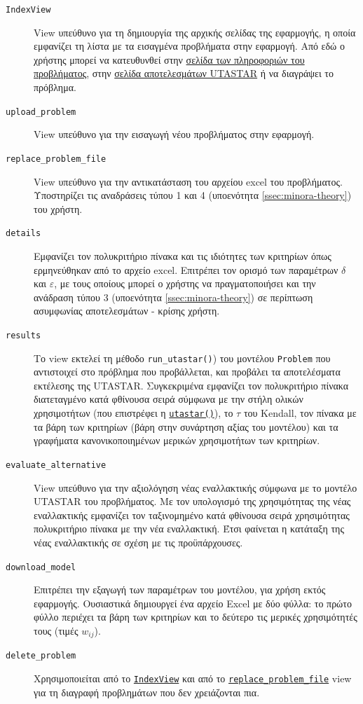 \documentclass[11pt,a4paper,titlepage]{article}
\numberwithin{equation}{section}
\begin{document}
\begin{description}
\item[\hypertarget{IndexView}{\texttt{IndexView}}] View υπεύθυνο για τη δημιουργία της αρχικής σελίδας της εφαρμογής, η 
οποία εμφανίζει τη λίστα με τα εισαγμένα προβλήματα στην εφαρμογή. Από εδώ ο χρήστης μπορεί να
κατευθυνθεί στην \hyperlink{details}{σελίδα των πληροφοριών του προβλήματος}, στην \hyperlink{results}{σελίδα αποτελεσμάτων UTASTAR} ή να διαγράψει το πρόβλημα.
\item[\hypertarget{uploadproblem}{\texttt{upload\_problem}}] View υπεύθυνο για την εισαγωγή νέου προβλήματος στην εφαρμογή.
\item[\hypertarget{replaceproblemfile}{\texttt{replace\_problem\_file}}] View υπεύθυνο για την αντικατάσταση του αρχείου excel του προβλήματος. Υποστηρίζει τις αναδράσεις τύπου 1 και 4 (υποενότητα \ref{ssec:minora-theory}) του χρήστη.
\item[\hypertarget{details}{\texttt{details}}] Εμφανίζει τον πολυκριτήριο πίνακα και τις ιδιότητες των κριτηρίων όπως ερμηνεύθηκαν από το αρχείο excel. Επιτρέπει τον ορισμό των παραμέτρων $ \delta $ και $ \varepsilon $, με τους οποίους μπορεί ο χρήστης να πραγματοποιήσει και την ανάδραση τύπου 3 (υποενότητα \ref{ssec:minora-theory}) σε περίπτωση ασυμφωνίας αποτελεσμάτων - κρίσης χρήστη.
\item[\hypertarget{results}{\texttt{results}}] Το view εκτελεί τη μέθοδο \texttt{run\_utastar()}) του μοντέλου \texttt{Problem} που αντιστοιχεί στο πρόβλημα που προβάλλεται, και προβάλει τα αποτελέσματα εκτέλεσης της UTASTAR. Συγκεκριμένα εμφανίζει τον πολυκριτήριο πίνακα διατεταγμένο κατά φθίνουσα σειρά σύμφωνα με την στήλη ολικών χρησιμοτήτων (που επιστρέφει η \hyperref[sssec:utastar()]{\texttt{utastar()}}), το $ \tau $ του Kendall, τον πίνακα με τα βάρη των κριτηρίων (βάρη στην συνάρτηση αξίας του μοντέλου) και τα γραφήματα κανονικοποιημένων μερικών χρησιμοτήτων των κριτηρίων.
\item[\hypertarget{evaluatealternative}{\texttt{evaluate\_alternative}}] View υπεύθυνο για την αξιολόγηση νέας εναλλακτικής σύμφωνα με το μοντέλο UTASTAR του προβλήματος. Με τον υπολογισμό της χρησιμότητας της νέας εναλλακτικής εμφανίζει τον ταξινομημένο κατά φθίνουσα σειρά χρησιμότητας πολυκριτήριο πίνακα με την νέα εναλλακτική. Έτσι φαίνεται η κατάταξη της νέας εναλλακτικής σε σχέση με τις προϋπάρχουσες.
\item[\hypertarget{downloadmodel}{\texttt{download\_model}}] Επιτρέπει την εξαγωγή των παραμέτρων του μοντέλου, για χρήση εκτός εφαρμογής. Ουσιαστικά δημιουργεί ένα αρχείο Excel με δύο φύλλα: το πρώτο φύλλο περιέχει τα βάρη των κριτηρίων και το δεύτερο τις μερικές χρησιμότητές τους (τιμές $ w_{ij} $).
\item[\hypertarget{deleteproblem}{\texttt{delete\_problem}}] Χρησιμοποιείται από το \hyperlink{IndexView}{\texttt{IndexView}} και από το \hyperlink{replaceproblemfile}{\texttt{replace\_problem\_file}} view για τη διαγραφή προβλημάτων που δεν χρειάζονται πια.
\end{description}
\end{document}
